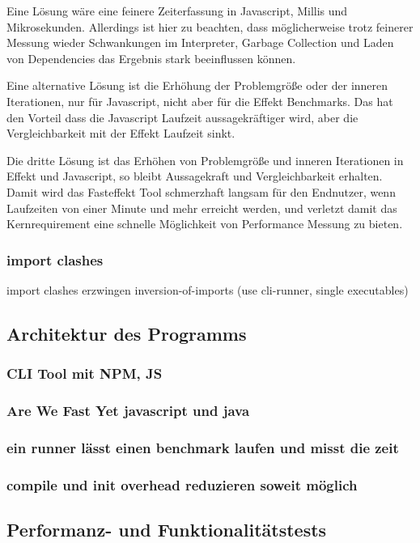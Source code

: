 Eine Lösung wäre eine feinere Zeiterfassung in Javascript, Millis und Mikrosekunden. Allerdings ist hier zu beachten, dass möglicherweise trotz feinerer Messung wieder Schwankungen im Interpreter, Garbage Collection und Laden von Dependencies das Ergebnis stark beeinflussen können.

Eine alternative Lösung ist die Erhöhung der Problemgröße oder der inneren Iterationen, nur für Javascript, nicht aber für die Effekt Benchmarks.
Das hat den Vorteil dass die Javascript Laufzeit aussagekräftiger wird, aber die Vergleichbarkeit mit der Effekt Laufzeit sinkt.

Die dritte Lösung ist das Erhöhen von Problemgröße und inneren Iterationen in Effekt und Javascript, so bleibt Aussagekraft und Vergleichbarkeit erhalten.
Damit wird das Fasteffekt Tool schmerzhaft langsam für den Endnutzer, wenn Laufzeiten von einer Minute und mehr erreicht werden, und verletzt damit das Kernrequirement eine schnelle Möglichkeit von Performance Messung zu bieten.

\subsubsection{ import clashes}
import clashes erzwingen inversion-of-imports (use cli-runner, single executables)

\subsection{Architektur des Programms}
\subsubsection{ CLI Tool mit NPM, JS }
\subsubsection{ Are We Fast Yet javascript und java }
\subsubsection{ ein runner lässt einen benchmark laufen und misst die zeit }
\subsubsection{ compile und init overhead reduzieren soweit möglich }
  
\subsection{ Performanz- und Funktionalitätstests }
